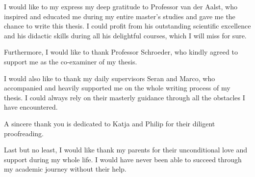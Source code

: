 I would like to my express my deep gratitude to Professor van der Aalst, who inspired and educated me during my entire master's studies and gave me the chance to write this thesis.
I could profit from his outstanding scientific excellence and his didactic skills during all his delightful courses, which I will miss for sure.

Furthermore, I would like to thank Professor Schroeder, who kindly agreed to support me as the co-examiner of my thesis.

I would also like to thank my daily supervisors Seran and Marco, who accompanied and heavily supported me on the whole writing process of my thesis.
I could always rely on their masterly guidance through all the obstacles I have encountered.

A sincere thank you is dedicated to Katja and Philip for their diligent proofreading.

Last but no least, I would like thank my parents for their unconditional love and support during my whole life.
I would have never been able to succeed through my academic journey without their help.